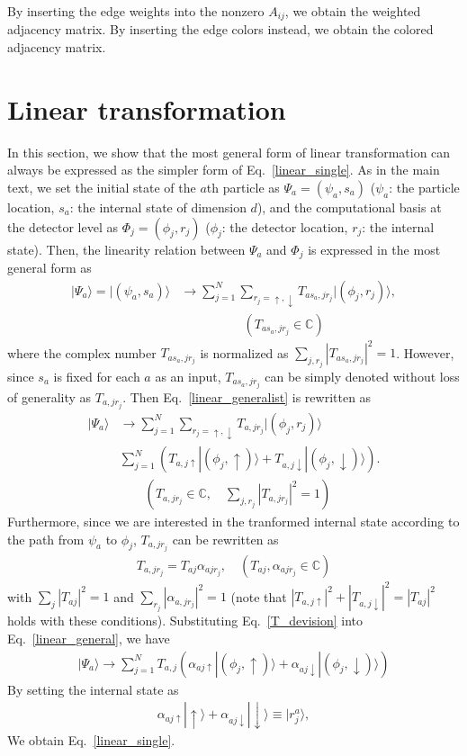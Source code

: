 \documentclass[a4paper,twocolumn,8pt,accepted=2021-12-15]{quantumarticle}
\newcommand{\nn}{\nonumber}
\def\a{\alpha}
\def\p{\psi}
\def\P{\Psi}
\def\>{\rangle}
\begin{document}
	
	By inserting the edge weights into the nonzero $A_{ij}$, we obtain the weighted adjacency matrix. By inserting the edge colors instead, we obtain the colored adjacency matrix. 
	
	\section{Linear transformation}	\label{lineartransformation}
	In this section, we show that the most general form of linear transformation can always be expressed as the simpler form of Eq.~\eqref{linear_single}. As in the main text, we set the initial state of the $a$th particle as $\P_a = (\p_a, s_a)$ ($\p_a$: the particle location, $s_a$: the internal state of dimension $d$), and the computational basis at the detector level as $\Phi_j = (\phi_j, r_j)$ ($\phi_j$: the detector location, $r_j$: the internal state). 
	Then, the linearity relation between $\P_a$ and $\Phi_j$ is expressed in the most general form as 
	\begin{align}\label{linear_generalist}
		|\P_a\>=	|(\p_a,s_a)\> &\to  \sum_{j=1}^N\sum_{r_j=\uparrow,\downarrow} T_{as_a,jr_j}|(\phi_j, r_j)\>, \nn \\
		&\qquad \qquad \quad  (T_{as_a,jr_j} \in \mathbb{C})  
	\end{align} where the complex number $T_{as_a,jr_j}$ is normalized as $\sum_{j,r_j}|T_{as_a,jr_j}|^2 =1$.  However, since $s_a$ is fixed for each $a$ as an input, $T_{as_a,jr_j}$ can be simply denoted without loss of generality as $T_{a,jr_j}$. Then Eq.~\eqref{linear_generalist} is rewritten as 
	\begin{align}\label{linear_general}
		|\P_a\>&\to \sum_{j=1}^N\sum_{r_j=\uparrow,\downarrow} T_{a,jr_j}|(\phi_j, r_j)\> \nn \\
		&\sum_{j=1}^N (T_{a,j\uparrow}|(\phi_j, \uparrow)\> +  T_{a,j\downarrow}|(\phi_j, \downarrow)\>).\nn \\
		&\qquad (T_{a,jr_j} \in \mathbb{C},\quad \sum_{j,r_j}|T_{a,jr_j}|^2 =1)  
	\end{align} 
	Furthermore, since we are interested in the tranformed internal state according to the path from $\p_a$ to $\phi_j$, $T_{a,jr_j}$ can be rewritten as
	\begin{align}\label{T_devision}
		T_{a,jr_j} = T_{aj}\a_{ajr_j}, \quad (T_{aj}, \a_{ajr_j} \in \mathbb{C})
	\end{align} with $\sum_{j}|T_{aj}|^2 =1$ and $\sum_{r_j}|\a_{a,jr_j}|^2=1$ (note that $|T_{a,j\uparrow}|^2 + |T_{a,j\downarrow}|^2 = |T_{aj}|^2$ holds with these conditions).
	Substituting Eq.~\eqref{T_devision} into Eq.~\eqref{linear_general}, we have
	\begin{align}\label{linear_simpler}
		|\P_a\>\to \sum_{j=1}^N T_{a,j}(\a_{aj\uparrow}|(\phi_j, \uparrow)\> +  \a_{aj\downarrow}|(\phi_j, \downarrow)\>)
	\end{align} 
	By setting the internal state as 
	\begin{align}
		\a_{aj\uparrow}|\uparrow\> + \a_{aj\downarrow}|\downarrow\> \equiv |r_{j}^a\>, 	
	\end{align}
	We obtain Eq.~\eqref{linear_single}. 
	
\end{document}
